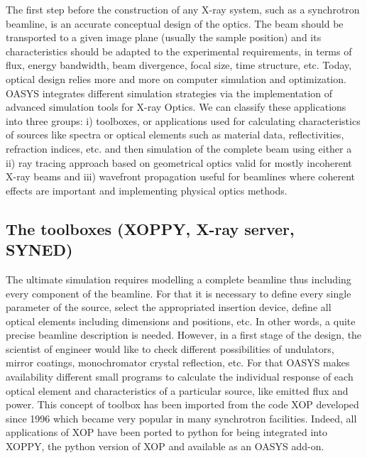 \documentclass{aip-cp}
\begin{document}
The first step before the construction of any X-ray system, such as a synchrotron beamline, is an accurate conceptual design of the optics. The beam should be transported to a given image plane (usually the sample position) and its characteristics should be adapted to the experimental requirements, in terms of flux, energy bandwidth, beam divergence, focal size, time structure, etc.
Today, optical design relies more and more on computer simulation and optimization. 
OASYS integrates different simulation strategies via the implementation of advanced simulation tools for X-ray Optics. We can classify these applications into three groups: i) toolboxes, or applications used for calculating characteristics of sources like spectra or optical elements such as material data, reflectivities, refraction indices, etc. and then simulation of the complete beam using either a ii) ray tracing approach based on geometrical optics valid for mostly incoherent X-ray beams and iii) wavefront propagation useful for beamlines where coherent effects are important and implementing physical optics methods.  

\subsection{The toolboxes (XOPPY, X-ray server, SYNED)}

The ultimate simulation requires modelling a complete beamline thus including every component of the beamline. For that it is necessary to define every single parameter of the source,  select the appropriated insertion device, define all optical elements including dimensions and positions, etc. In other words, a quite precise beamline description is needed. However, in a first stage of the design, the scientist of engineer would like to check different possibilities of undulators, mirror coatings, monochromator crystal reflection, etc. For that OASYS makes availability different small programs to calculate the individual response of each optical element and characteristics of a particular source, like emitted flux and power. This concept of toolbox has been imported from the code XOP \cite{xop} developed since 1996 which became very popular in many synchrotron facilities. Indeed, all applications of XOP have been ported to python for being integrated into XOPPY, the python version of XOP and available as an OASYS add-on.  
\end{document}
